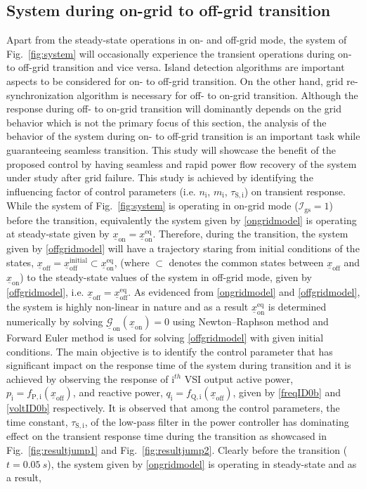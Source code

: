 \documentclass[journal]{IEEEtran}
\begin{document}
\subsection{System during on-grid to off-grid transition}
Apart from the steady-state operations in on- and off-grid mode, the system of Fig.~\ref{fig:system} will occasionally experience the transient operations during on- to off-grid transition and vice versa. Island detection algorithms are important aspects to be considered for on- to off-grid transition. On the other hand, grid re-synchronization algorithm is necessary for off- to on-grid transition. Although the response during off- to on-grid transition will dominantly depends on the grid behavior which is not the primary focus of this section, the analysis of the behavior of the system during on- to off-grid transition is an important task while guaranteeing seamless transition. This study will showcase the benefit of the proposed control by having seamless and rapid power flow recovery of the system under study after grid failure. This study is achieved by identifying the influencing factor of control parameters (i.e. $n_\mathrm{i}$, $m_\mathrm{i}$, $\tau_\mathrm{S,i}$) on transient response. While the system of Fig.~\ref{fig:system} is operating in on-grid mode ($\mathcal{I}_\mathrm{gs}=1$) before the transition, equivalently the system given by \eqref{ongridmodel} is operating at steady-state given by $\underline{x}_\mathrm{on}=\underline{x}_\mathrm{on}^\mathrm{eq}$. Therefore, during the transition, the system given by \eqref{offgridmodel} will have a trajectory staring from initial conditions of the states, $\underline{x}_\mathrm{off}=\underline{x}_\mathrm{off}^\mathrm{initial} \subset \underline{x}_\mathrm{on}^\mathrm{eq}$, (where $\subset$ denotes the common states between $\underline{x}_\mathrm{off}$ and $\underline{x}_\mathrm{on}$) to the steady-state values of the system in off-grid mode, given by \eqref{offgridmodel}, i.e. $\underline{x}_\mathrm{off}=\underline{x}_\mathrm{off}^\mathrm{eq}$. As evidenced from \eqref{ongridmodel} and \eqref{offgridmodel}, the system is highly non-linear in nature and as a result $\underline{x}_\mathrm{on}^\mathrm{eq}$ is determined numerically by solving $\mathcal{\underline{G}}_\mathrm{on}(\underline{x}_\mathrm{on})=0$ using Newton–Raphson method and Forward Euler method is used for solving \eqref{offgridmodel} with given initial conditions. The main objective is to identify the control parameter that has significant impact on the response time of the system during transition and it is achieved by observing the response of $\mathrm{i}^{th}$ VSI output active power, $p_\mathrm{i}=f_\mathrm{P,i}(\underline{x}_\mathrm{off})$, and reactive power, $q_\mathrm{i}=f_\mathrm{Q,i}(\underline{x}_\mathrm{off})$, given by \eqref{freqID0b} and \eqref{voltID0b} respectively. It is observed that among the control parameters, the time constant, $\tau_\mathrm{S,i}$, of the low-pass filter in the power controller has dominating effect on the transient response time during the transition as showcased in Fig.~\ref{fig:resultjump1} and Fig.~\ref{fig:resultjump2}. Clearly before the transition ($t=0.05~s$), the system given by \eqref{ongridmodel} is operating in steady-state and as a result, 
\end{document}
